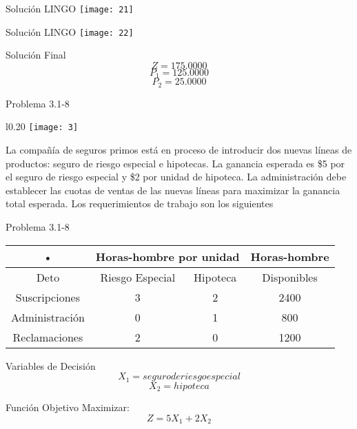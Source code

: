 \documentclass{beamer}
\begin{document}
\begin{frame}[fragile]{Solución LINGO}
    \texttt{[image: 21]}
\end{frame}
\begin{frame}[fragile]{Solución LINGO}
    \texttt{[image: 22]}
\end{frame}

\begin{frame}[fragile]{Solución Final}
\[Z = 175.0000\]
\[P_{1} = 125.0000\]
\[P_{2} = 25.0000\]
\end{frame}

\begin{frame}[t,fragile]{Problema 3.1-8 }
\begin{wrapfigure}{l}{0.20\textwidth}
    \centering
    \texttt{[image: 3]}
\end{wrapfigure} La compañía de seguros primos está en proceso de introducir dos nuevas líneas de productos: seguro de riesgo especial e hipotecas. La ganancia esperada es \$5 por el seguro de riesgo especial y \$2 por unidad de hipoteca.
La administración debe establecer las cuotas de ventas de las nuevas líneas para maximizar la ganancia total esperada. Los requerimientos de trabajo son los siguientes\\
\end{frame}
\begin{frame}[t,fragile]{Problema 3.1-8 }

\begin{tabular}{|c|c|c|c|}
\hline 
• & \multicolumn{2}{c|}{Horas-hombre por unidad} & Horas-hombre \\ 
\hline 
Deto & Riesgo Especial & Hipoteca & Disponibles \\ 
\hline 
Suscripciones & 3 & 2 & 2400 \\ 
\hline 
Administración & 0 & 1 & 800 \\ 
\hline 
Reclamaciones & 2 & 0 & 1200 \\ 
\hline 
\end{tabular} 
\end{frame}

\begin{frame}[fragile]{Variables de Decisión}
\[X_{1} = seguro de riesgo especial\]
\[X_{2} = hipoteca\]

\end{frame}

\begin{frame}[fragile]{Función Objetivo}
Maximizar:\\
\[Z = 5X_{1} + 2X_{2}\]
\end{frame}
\end{document}
